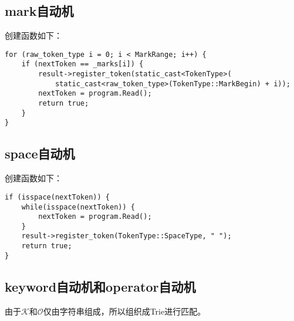 \documentclass[UTF8]{ctexart}
\begin{document}
\subsection{mark自动机}
\begin{figure}[!h]
    \centering
\end{figure}
\par 创建函数如下：
{\firacode
\begin{lstlisting}[language={[ANSI]C++}]
for (raw_token_type i = 0; i < MarkRange; i++) {
    if (nextToken == _marks[i]) {
        result->register_token(static_cast<TokenType>(
            static_cast<raw_token_type>(TokenType::MarkBegin) + i));
        nextToken = program.Read();
        return true;
    }
}
\end{lstlisting}
}

\subsection{space自动机}
\begin{figure}[!h]
    \centering
\end{figure}
\par 创建函数如下：
{\firacode
\begin{lstlisting}[language={[ANSI]C++}]
if (isspace(nextToken)) {
    while(isspace(nextToken)) {
        nextToken = program.Read();
    }
    result->register_token(TokenType::SpaceType, " ");
    return true;
}
\end{lstlisting}
}
\subsection{keyword自动机和operator自动机}
由于$\mathcal{K}$和$\mathcal{O}$仅由字符串组成，所以组织成Trie进行匹配。
\end{document}
